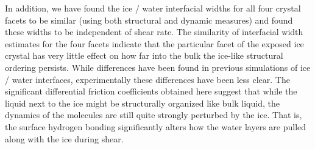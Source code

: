 In addition, we have found the ice / water interfacial widths for all
four crystal facets to be similar (using both structural and dynamic
measures) and found these widths to be independent of shear rate.  The
similarity of interfacial width estimates for the four facets indicate
that the particular facet of the exposed ice crystal has very little
effect on how far into the bulk the ice-like structural ordering
persists. While differences have been found in previous simulations of
ice / water interfaces,\cite{Hayward2001,Hayward2002} experimentally
these differences have been less clear.\cite{Beaglehole1993} The
significant differential friction coefficients obtained here suggest
that while the liquid next to the ice might be structurally organized
like bulk liquid, the dynamics of the molecules are still quite
strongly perturbed by the ice.  That is, the surface hydrogen bonding
significantly alters how the water layers are pulled along with the
ice during shear.


